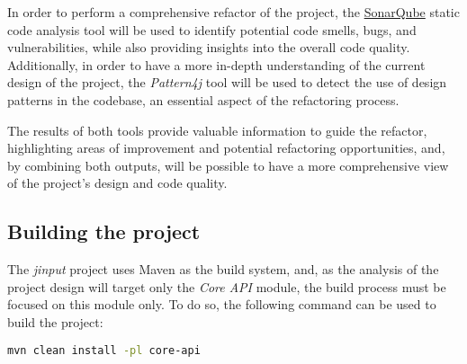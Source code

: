 In order to perform a comprehensive refactor of the project, the \href{https://www.sonarsource.com/}{SonarQube} static code analysis tool will be used to identify potential code smells, bugs, and vulnerabilities, while also providing insights into the overall code quality. Additionally, in order to have a more in-depth understanding of the current design of the project, the \textit{Pattern4j} tool will be used to detect the use of design patterns in the codebase, an essential aspect of the refactoring process.

The results of both tools provide valuable information to guide the refactor, highlighting areas of improvement and potential refactoring opportunities, and, by combining both outputs, will be possible to have a more comprehensive view of the project's design and code quality.

\subsection{Building the project}

The \emph{jinput} project uses Maven as the build system, and, as the analysis of the project design will target only the \emph{Core API} module, the build process must be focused on this module only. To do so, the following command can be used to build the project:

\begin{center}
	\begin{minipage}{0.5\textwidth}
		\begin{lstlisting}[language=bash, caption={Building the project using Maven}]
    mvn clean install -pl core-api
  \end{lstlisting}
	\end{minipage}
\end{center}

